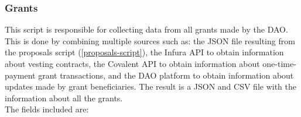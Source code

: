 \documentclass[MSE,Master,english]{twbook}%
\begin{document}
\subsubsection{Grants}
This script is responsible for collecting data from all grants made by the DAO. This is done by combining multiple sources such as: the JSON file resulting from the proposals script (\ref{proposals-script}), the Infura API to obtain information about vesting contracts, the Covalent API to obtain information about one-time-payment grant transactions, and the DAO platform to obtain information about updates made by grant beneficiaries. The result is a JSON and CSV file with the information about all the grants. \\

The fields included are:
\begin{table}[H]
  \centering
\end{table}
\end{document}
